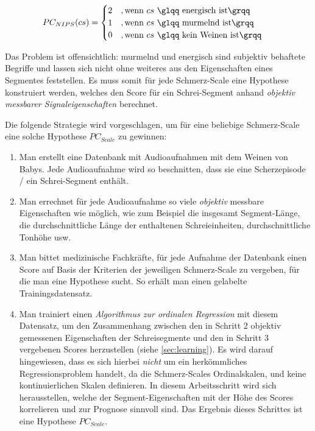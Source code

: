 \begin{equation}
PC_{NIPS}(cs) = \begin{cases}
 2 \quad ,\text{wenn } cs \text{ \glqq energisch ist\grqq } \\
 1 \quad ,\text{wenn } cs \text{ \glqq murmelnd ist\grqq } \\
 0 \quad ,\text{wenn } cs \text{ \glqq kein Weinen ist\grqq }
 \end{cases}	
\end{equation}

Das Problem ist offensichtlich: \glqq murmelnd\grqq{} und \glqq energisch\grqq{} sind subjektiv behaftete Begriffe und lassen sich nicht ohne weiteres aus den Eigenschaften eines Segmentes feststellen. Es muss somit für jede Schmerz-Scale eine Hypothese konstruiert werden, welches den Score für ein Schrei-Segment anhand \emph{objektiv messbarer Signaleigenschaften} berechnet. 

Die folgende Strategie wird vorgeschlagen, um für eine beliebige Schmerz-Scale eine solche Hypothese $PC_{Scale}$ zu gewinnen:

\begin{enumerate}
 \item Man erstellt eine Datenbank mit Audioaufnahmen mit dem Weinen von Babys. Jede Audioaufnahme wird so beschnitten, dass sie eine Scherzepisode / ein Schrei-Segment enthält.
 \item Man errechnet für jede Audioaufnahme \glqq so viele \emph{objektiv} messbare Eigenschaften wie möglich\grqq{}, wie zum Beispiel die insgesamt Segment-Länge, die durchschnittliche Länge der enthaltenen Schreieinheiten, durchschnittliche Tonhöhe usw.
 \item Man bittet medizinische Fachkräfte, für jede Aufnahme der Datenbank einen Score auf Basis der Kriterien der jeweiligen Schmerz-Scale zu vergeben, für die man eine Hypothese sucht. So erhält man einen gelabelte Trainingsdatensatz.
 \item Man trainiert einen \emph{Algorithmus zur ordinalen Regression} mit diesem Datensatz, um den Zusammenhang zwischen den in Schritt 2 objektiv gemessenen Eigenschaften der Schreisegmente und den in Schritt 3 vergebenen Scores herzustellen (siehe \autoref{sec:learning}). Es wird darauf hingewiesen, dass es sich hierbei \emph{nicht} um ein herkömmliches Regressionsproblem handelt, da die Schmerz-Scales Ordinalskalen, und keine kontinuierlichen Skalen definieren. In diesem Arbeitsschritt wird sich herausstellen, welche der Segment-Eigenschaften mit der Höhe des Scores korrelieren und zur Prognose sinnvoll sind. Das Ergebnis dieses Schrittes ist eine Hypothese $PC_{Scale}$.
\end{enumerate}

